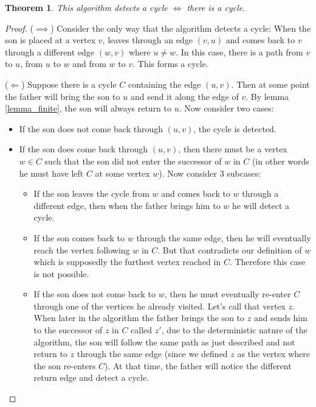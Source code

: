 \documentclass{article}
\newtheorem{theorem}{Theorem}
\begin{document}
\begin{theorem}This algorithm detects a cycle $\iff$ there is a cycle.\end{theorem}
\begin{proof}
($\implies$) Consider the only way that the algorithm detects a cycle: When the son is placed at a vertex $v$, leaves through an edge $(v,u)$ and comes back to $v$ through a different edge $(w,v)$ where $u\not=w$. In this case, there is a path from $v$ to $u$, from $u$ to $w$ and from $w$ to $v$. This forms a cycle.

($\Longleftarrow$) Suppose there is a cycle $C$ containing the edge $(u,v)$. Then at some point the father will bring the son to $u$ and send it along the edge of $v$. By lemma \ref{lemma_finite}, the son will always return to $u$. Now consider two cases:
\begin{itemize}
\item If the son does not come back through $(u,v)$, the cycle is detected.
\item If the son does come back through $(u,v)$, then there must be a vertex $w \in C$ such that the son did not enter the successor of $w$ in $C$ (in other words he must have left $C$ at some vertex $w$). Now consider 3 subcases:
\begin{itemize}
\item If the son leaves the cycle from $w$ and comes back to $w$ through a different edge, then when the father brings him to $w$ he will detect a cycle.
\item If the son comes back to $w$ through the same edge, then he will eventually reach the vertex following $w$ in $C$. But that contradicts our definition of $w$ which is supposedly the furthest vertex reached in $C$. Therefore this case is not possible. %
\item If the son does not come back to $w$, then he must eventually re-enter $C$ through one of the vertices he already visited. Let's call that vertex $z$. When later in the algorithm the father brings the son to $z$ and sends him to the successor of $z$ in $C$ called $z'$, due to the deterministic nature of the algorithm, the son will follow the same path as just described and not return to $z$ through the same edge (since we defined $z$ as the vertex where the son re-enters $C$). At that time, the father will notice the different return edge and detect a cycle.
\end{itemize}
\end{itemize}


\end{proof}
\end{document}

